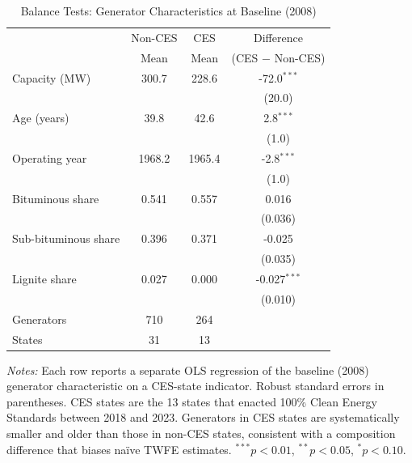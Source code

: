 \begin{table}[t]
\centering
\caption{Balance Tests: Generator Characteristics at Baseline (2008)}
\label{tab:balance}
\begin{tabular}{lccc}
\toprule
 & Non-CES & CES & Difference \\
 & Mean & Mean & (CES $-$ Non-CES) \\
\midrule
Capacity (MW) & 300.7 & 228.6 & -72.0$^{***}$ \\
 & & & (20.0) \\
[3pt]
Age (years) & 39.8 & 42.6 & 2.8$^{***}$ \\
 & & & (1.0) \\
[3pt]
Operating year & 1968.2 & 1965.4 & -2.8$^{***}$ \\
 & & & (1.0) \\
[3pt]
Bituminous share & 0.541 & 0.557 & 0.016 \\
 & & & (0.036) \\
[3pt]
Sub-bituminous share & 0.396 & 0.371 & -0.025 \\
 & & & (0.035) \\
[3pt]
Lignite share & 0.027 & 0.000 & -0.027$^{***}$ \\
 & & & (0.010) \\
[6pt]
\midrule
Generators & 710 & 264 & \\
States & 31 & 13 & \\
\bottomrule
\end{tabular}
\begin{minipage}{0.92\textwidth}
\vspace{4pt}
\footnotesize
\textit{Notes:} Each row reports a separate OLS regression of the baseline (2008)
generator characteristic on a CES-state indicator. Robust standard errors in parentheses.
CES states are the 13 states that enacted 100\% Clean Energy Standards between 2018 and 2023.
Generators in CES states are systematically smaller and older than those in non-CES states,
consistent with a composition difference that biases na\"ive TWFE estimates.
$^{***}p<0.01$, $^{**}p<0.05$, $^{*}p<0.10$.
\end{minipage}
\end{table}
